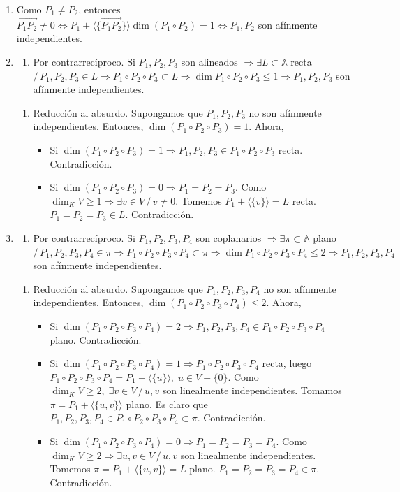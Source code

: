 \documentclass[12pt, a4paper, ones, notitlepage, openany,titlepage]{article}
\newcommand{\dobleimplicacion}[2]{
	\begin{enumerate}[label=$\Rightarrow/$]
		\item #1
	\end{enumerate}
	\begin{enumerate}[label=$\Leftarrow/$]
		\item #2
	\end{enumerate}
}
\begin{document}
\begin{enumerate}[label=(\arabic*)]
	\item Como $P_1 \neq P_2$, entonces $\overrightarrow{P_1 P_2} \neq 0 \Longleftrightarrow P_1 + \langle\{\overrightarrow{P_1 P_2}\}\rangle \dim(P_1 \circ P_2) = 1 \Longleftrightarrow P_1, P_2$ son afínmente independientes.
	\item \dobleimplicacion{Por contrarrecíproco.
	Si $P_1, P_2, P_3$ son alineados $\Longrightarrow \exists L \subset \mathbb{A}$ recta $/\, P_1, P_2, P_3 \in L \Longrightarrow P_1 \circ P_2 \circ P_3 \subset L \Longrightarrow \dim P_1 \circ P_2 \circ P_3 \le 1 \Longrightarrow P_1, P_2, P_3$ son afínmente independientes.
	}{Reducción al absurdo.
	Supongamos que $P_1, P_2, P_3$ no son afínmente independientes. Entonces, $\dim (P_1 \circ P_2 \circ P_3) = 1$. Ahora,
	\begin{itemize}
		\item Si $\dim(P_1 \circ P_2 \circ P_3) = 1 \Longrightarrow P_1, P_2, P_3 \in P_1 \circ P_2 \circ P_3$ recta. Contradicción.
		\item Si $\dim (P_1 \circ P_2 \circ P_3) = 0 \Longrightarrow P_1 = P_2 = P_3$. Como $\dim_K V \ge 1 \Longrightarrow \exists v \in V \,/\, v \neq 0$. Tomemos $P_1 + \langle\{v\}\rangle = L$ recta. $P_1 = P_2 = P_3 \in L$. Contradicción.
	\end{itemize}
	}
	\item \dobleimplicacion{Por contrarrecíproco.
	Si $P_1, P_2, P_3, P_4$ son coplanarios $\Longrightarrow \exists \pi \subset \mathbb{A}$ plano $/\, P_1, P_2, P_3, P_4 \in \pi \Longrightarrow P_1 \circ P_2 \circ P_3 \circ P_4 \subset \pi \Longrightarrow \dim P_1 \circ P_2 \circ P_3 \circ P_4 \le 2 \Longrightarrow P_1, P_2, P_3, P_4$ son afínmente independientes.
	}{Reducción al absurdo.
	Supongamos que $P_1, P_2, P_3, P_4$ no son afínmente independientes. Entonces, $\dim (P_1 \circ P_2 \circ P_3 \circ P_4) \le 2$. Ahora,
	\begin{itemize}
		\item Si $\dim(P_1 \circ P_2 \circ P_3 \circ P_4) = 2 \Longrightarrow P_1, P_2, P_3, P_4 \in P_1 \circ P_2 \circ P_3 \circ P_4$ plano. Contradicción.
		\item Si $\dim (P_1 \circ P_2 \circ P_3 \circ P_4) = 1 \Longrightarrow P_1 \circ P_2 \circ P_3 \circ P_4$ recta, luego $P_1 \circ P_2 \circ P_3 \circ P_4 = P_1 + \langle\{u\}\rangle, \; u \in V-\{0\}$. Como $\dim_K V \ge 2, \; \exists v \in V \,/\, u, v$ son linealmente independientes. Tomamos $\pi = P_1 + \langle\{u,v\}\rangle$ plano. Es claro que $P_1, P_2, P_3, P_4 \in P_1 \circ P_2 \circ P_3 \circ P_4 \subset \pi$. Contradicción.
		\item Si $\dim (P_1 \circ P_2 \circ P_3 \circ P_4) = 0 \Longrightarrow P_1 = P_2 = P_3 = P_4$. Como $\dim_K V \ge 2 \Longrightarrow \exists u,v \in V \,/\, u,v$ son linealmente independientes. Tomemos $\pi = P_1 + \langle\{u,v\}\rangle = L$ plano. $P_1 = P_2 = P_3 = P_4 \in \pi$. Contradicción.
	\end{itemize}
	}
\end{enumerate}
\end{document}
